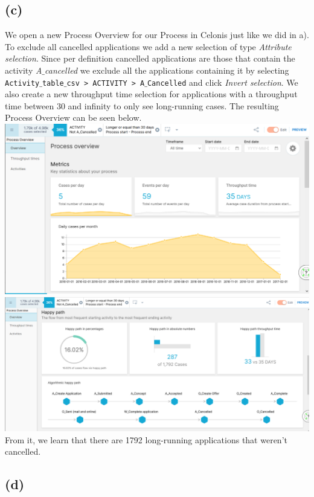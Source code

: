 \documentclass[../../main.tex]{subfiles}
\begin{document}
\subsection*{(c)}
We open a new Process Overview for our Process in Celonis just like we did in a). To exclude all cancelled applications we add a new selection of type \textit{Attribute selection}. Since per definition cancelled applications are those that contain the activity \textit{A$\_$cancelled} we exclude all the applications containing it by selecting \texttt{Activity$\_$table$\_$csv > ACTIVITY > A$\_$Cancelled} and click \textit{Invert selection}. We also create a new throughput time selection for applications with a throughput time between 30 and infinity to only see long-running cases. The resulting Process Overview can be seen below.\\
\includegraphics[width=\textwidth]{img/QUESTION_5c_process_overview.png}
\includegraphics[width=\textwidth]{img/QUESTION_5c_process_overview_happy_path.png}
From it, we learn that there are 1792 long-running applications that weren't cancelled.


\subsection*{(d)}
\end{document}
